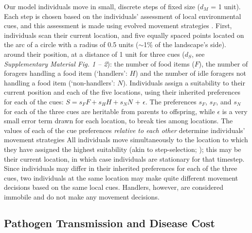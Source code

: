 Our model individuals move in small, discrete steps of fixed size ($d_M$ = 1 unit).
Each step is chosen based on the individuals' assessment of local environmental cues, and this assessment is made using evolved movement strategies \citep[as in][]{netz2021,gupte2021a}.
First, individuals scan their current location, and five equally spaced points located on the arc of a circle with a radius of 0.5 units ($\sim$1\% of the landscape's side).
around their position, at a distance of 1 unit for three cues ($d_S$, see \textit{Supplementary Material Fig. 1 -- 2}): the number of food items ($F$), the number of foragers handling a food item (`handlers': $H$) and the number of idle foragers not handling a food item (`non-handlers': $N$).
Individuals assign a suitability \citep[see][]{netz2021,gupte2021a} to their current position and each of the five locations, using their inherited preferences for each of the cues: $S = s_FF + s_HH + s_NN$ + $\epsilon$.
The preferences $s_F$, $s_F$, and $s_N$ for each of the three cues are heritable from parents to offspring, while $\epsilon$ is a very small error term drawn for each location, to break ties among locations.
The values of each of the cue preferences \emph{relative to each other} determine individuals' movement strategies \citep{gupte2021a}
All individuals move simultaneously to the location to which they have assigned the highest suitability (akin to step-selection; \citealp{avgar2016}); this may be their current location, in which case individuals are stationary for that timestep.
Since individuals may differ in their inherited preferences for each of the three cues, two individuals at the same location may make quite different movement decisions based on the same local cues.
Handlers, however, are considered immobile and do not make any movement decisions.

\subsection*{Pathogen Transmission and Disease Cost}

